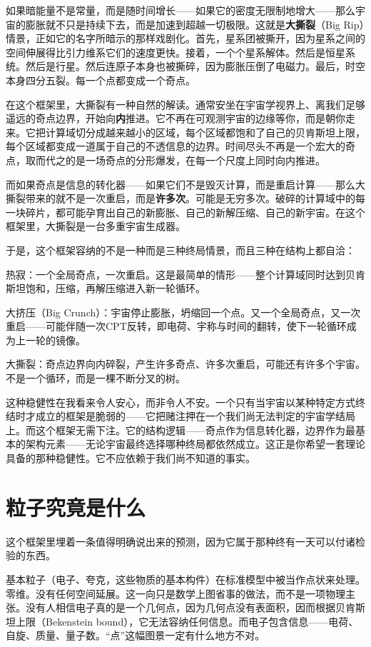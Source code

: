 \documentclass[11pt, twoside, openright]{book}
\begin{document}
如果暗能量不是常量，而是随时间增长------如果它的密度无限制地增大------那么宇宙的膨胀就不只是持续下去，而是加速到超越一切极限。这就是\textbf{大撕裂}（Big Rip）情景，正如它的名字所暗示的那样戏剧化。首先，星系团被撕开，因为星系之间的空间伸展得比引力维系它们的速度更快。接着，一个个星系解体。然后是恒星系统。然后是行星。然后连原子本身也被撕碎，因为膨胀压倒了电磁力。最后，时空本身四分五裂。每一个点都变成一个奇点。

在这个框架里，大撕裂有一种自然的解读。通常安坐在宇宙学视界上、离我们足够遥远的奇点边界，开始向\textbf{内}推进。它不再在可观测宇宙的边缘等你，而是朝你走来。它把计算域切分成越来越小的区域，每个区域都饱和了自己的贝肯斯坦上限，每个区域都变成一道属于自己的不透信息的边界。时间尽头不再是一个宏大的奇点，取而代之的是一场奇点的分形爆发，在每一个尺度上同时向内推进。

而如果奇点是信息的转化器------如果它们不是毁灭计算，而是重启计算------那么大撕裂带来的就不是一次重启，而是\textbf{许多次}。可能是无穷多次。破碎的计算域中的每一块碎片，都可能孕育出自己的新膨胀、自己的新解压缩、自己的新宇宙。在这个框架里，大撕裂是一台多重宇宙生成器。

于是，这个框架容纳的不是一种而是三种终局情景，而且三种在结构上都自洽：

热寂：一个全局奇点，一次重启。这是最简单的情形------整个计算域同时达到贝肯斯坦饱和，压缩，再解压缩进入新一轮循环。

大挤压（Big Crunch）：宇宙停止膨胀，坍缩回一个点。又一个全局奇点，又一次重启------可能伴随一次CPT反转，即电荷、宇称与时间的翻转，使下一轮循环成为上一轮的镜像。

大撕裂：奇点边界向内碎裂，产生许多奇点、许多次重启，可能还有许多个宇宙。不是一个循环，而是一棵不断分叉的树。

这种稳健性在我看来令人安心，而非令人不安。一个只有当宇宙以某种特定方式终结时才成立的框架是脆弱的------它把赌注押在一个我们尚无法判定的宇宙学结局上。而这个框架无需下注。它的结构逻辑------奇点作为信息转化器，边界作为最基本的架构元素------无论宇宙最终选择哪种终局都依然成立。这正是你希望一套理论具备的那种稳健性。它不应依赖于我们尚不知道的事实。


\section*{粒子究竟是什么}

这个框架里埋着一条值得明确说出来的预测，因为它属于那种终有一天可以付诸检验的东西。

基本粒子（电子、夸克，这些物质的基本构件）在标准模型中被当作点状来处理。零维。没有任何空间延展。这一向只是数学上图省事的做法，而不是一项物理主张。没有人相信电子真的是一个几何点，因为几何点没有表面积，因而根据贝肯斯坦上限（Bekenstein bound），它无法容纳任何信息。而电子包含信息------电荷、自旋、质量、量子数。“点”这幅图景一定有什么地方不对。
\end{document}
